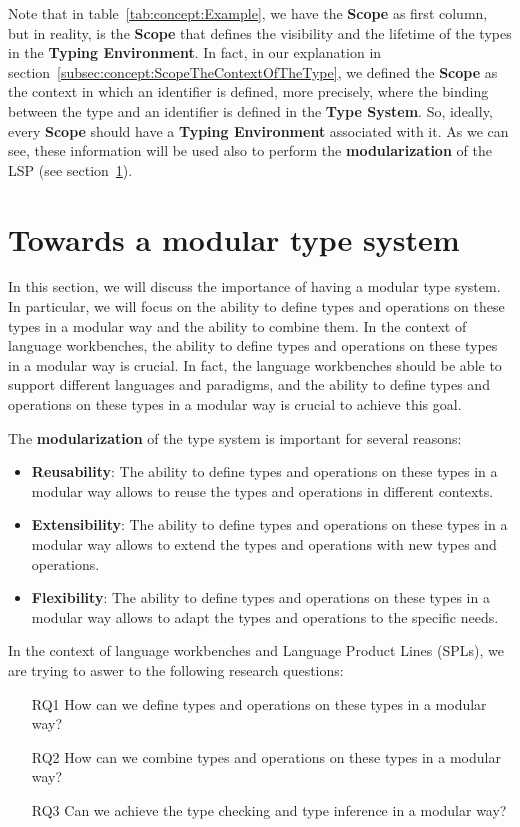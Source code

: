 Note that in table~\ref{tab:concept:Example}, we have the \textbf{Scope} as first column, but in reality, is the \textbf{Scope} that defines the visibility and the lifetime of the types in the \textbf{Typing Environment}. In fact, in our explanation in section~\ref{subsec:concept:ScopeTheContextOfTheType}, we defined the \textbf{Scope} as the context in which an identifier is defined, more precisely, where the binding between the type and an identifier is defined in the \textbf{Type System}. So, ideally, every \textbf{Scope} should have a \textbf{Typing Environment} associated with it.
As we can see, these information will be used also to perform the \textbf{modularization} of the LSP (see section~\ref{sec:concept:TowardsAModularTypeSystem}).


\section{Towards a modular type system}\label{sec:concept:TowardsAModularTypeSystem}

In this section, we will discuss the importance of having a modular type system. In particular, we will focus on the ability to define types and operations on these types in a modular way and the ability to combine them.
In the context of language workbenches, the ability to define types and operations on these types in a modular way is crucial. In fact, the language workbenches should be able to support different languages and paradigms, and the ability to define types and operations on these types in a modular way is crucial to achieve this goal.

The \textbf{modularization} of the type system is important for several reasons:
\begin{itemize}
    \item \textbf{Reusability}: The ability to define types and operations on these types in a modular way allows to reuse the types and operations in different contexts.
    \item \textbf{Extensibility}: The ability to define types and operations on these types in a modular way allows to extend the types and operations with new types and operations.
    \item \textbf{Flexibility}: The ability to define types and operations on these types in a modular way allows to adapt the types and operations to the specific needs.
\end{itemize}

In the context of language workbenches and Language Product Lines (SPLs), we are trying to aswer to the following research questions:
\begin{itemize}
    \item[RQ1] How can we define types and operations on these types in a modular way?
    \item[RQ2] How can we combine types and operations on these types in a modular way?
    \item[RQ3] Can we achieve the type checking and type inference in a modular way?
\end{itemize}

